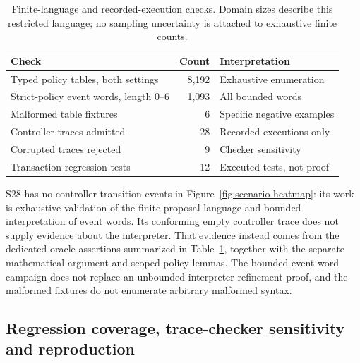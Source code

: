 \documentclass[pdflatex,sn-mathphys-num]{sn-jnl}
\theoremstyle{thmstyleone}
\theoremstyle{thmstylethree}
\theoremstyle{thmstyletwo}
\begin{document}
\begin{table}[tbp]
\centering
\caption{Finite-language and recorded-execution checks. Domain sizes describe this restricted language; no sampling uncertainty is attached to exhaustive finite counts.}\label{tab:validation-domains}
\footnotesize
\setlength{\tabcolsep}{3pt}
\renewcommand{\arraystretch}{1.13}
\begin{tabularx}{\linewidth}{@{}Xrl@{}}\toprule
Check & Count & Interpretation\\\midrule
Typed policy tables, both settings & 8,192 & Exhaustive enumeration\\
Strict-policy event words, length 0--6 & 1,093 & All bounded words\\
Malformed table fixtures & 6 & Specific negative examples\\
Controller traces admitted & 28 & Recorded executions only\\
Corrupted traces rejected & 9 & Checker sensitivity\\
Transaction regression tests & 12 & Executed tests, not proof\\
\bottomrule\end{tabularx}
\end{table}

S28 has no controller transition events in Figure~\ref{fig:scenario-heatmap}: its work is exhaustive validation of the finite proposal language and bounded interpretation of event words. Its conforming empty controller trace does not supply evidence about the interpreter. That evidence instead comes from the dedicated oracle assertions summarized in Table~\ref{tab:validation-domains}, together with the separate mathematical argument and scoped policy lemmas. The bounded event-word campaign does not replace an unbounded interpreter refinement proof, and the malformed fixtures do not enumerate arbitrary malformed syntax.

\subsection{Regression coverage, trace-checker sensitivity and reproduction}
\end{document}

